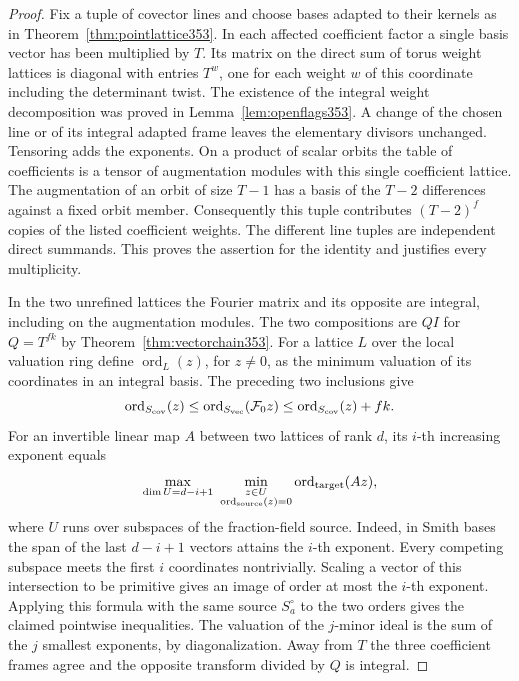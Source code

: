 \documentclass[a4paper,11pt]{article}
\theoremstyle{definition}
\theoremstyle{remark}
\numberwithin{equation}{section}
\begin{document}
\begin{proof}
Fix a tuple of covector lines and choose bases adapted to their
kernels as in Theorem~\ref{thm:pointlattice353}. In each
affected coefficient factor a single basis vector has been
multiplied by \(T\). Its matrix on the direct sum of torus
weight lattices is diagonal with entries \(T^w\), one for
each weight \(w\) of this coordinate including the determinant
twist. The existence of the integral weight decomposition was
proved in Lemma~\ref{lem:openflags353}. A change of the chosen
line or of its integral adapted frame leaves the elementary
divisors unchanged. Tensoring adds the exponents. On a product
of scalar orbits the table of coefficients is a tensor of
augmentation modules with this single coefficient lattice.
The augmentation of an orbit of size \(T-1\) has a basis of
the \(T-2\) differences against a fixed orbit member.
Consequently this tuple contributes \((T-2)^f\) copies of
the listed coefficient weights. The different line tuples
are independent direct summands. This proves the assertion
for the identity and justifies every multiplicity.

In the two unrefined lattices the Fourier matrix and its
opposite are integral, including on the augmentation modules.
The two compositions are \(Q I\) for \(Q=T^{fk}\) by
Theorem~\ref{thm:vectorchain353}. For a lattice \(L\) over
the local valuation ring define \(\operatorname{ord}_L(z)\),
for \(z\ne0\), as the minimum valuation of its coordinates
in an integral basis. The preceding two inclusions give
\[
  \operatorname{ord}_{S_{\rm cov}}(z)
       \le \operatorname{ord}_{S_{\rm vec}}(\mathcal F_0z)
       \le \operatorname{ord}_{S_{\rm cov}}(z)+fk .
\]
For an invertible linear map \(A\) between two lattices of
rank \(d\), its \(i\)-th increasing exponent equals
\[
 \max_{\dim U=d-i+1}\
 \min_{\substack{z\in U\\ \operatorname{ord}_{\rm source}(z)=0}}
                   \operatorname{ord}_{\rm target}(Az),
\]
where \(U\) runs over subspaces of the fraction-field source.
Indeed, in Smith bases the span of the last \(d-i+1\) vectors
attains the \(i\)-th exponent. Every competing subspace
meets the first \(i\) coordinates nontrivially. Scaling a vector
of this intersection to be primitive gives an image of order
at most the \(i\)-th exponent. Applying this formula with the
same source \(S_a^\circ\) to the two orders gives the claimed
pointwise inequalities. The valuation of the \(j\)-minor ideal
is the sum of the \(j\) smallest exponents, by diagonalization.
Away from \(T\) the three coefficient frames agree and the
opposite transform divided by \(Q\) is integral.
\end{proof}
\end{document}
